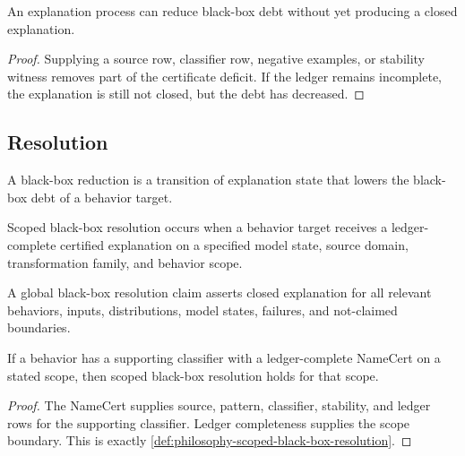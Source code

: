 \begin{theorem}
\label{thm:philosophy-black-box-debt-can-decrease-before-closure}
An explanation process can reduce black-box debt without yet producing a
closed explanation.
\end{theorem}
\begin{proof}
Supplying a source row, classifier row, negative examples, or stability
witness removes part of the certificate deficit. If the ledger remains
incomplete, the explanation is still not closed, but the debt has
decreased.
\end{proof}

\subsection{Resolution}
\label{subsec:philosophy-black-box-resolution}

\begin{definition}
\label{def:philosophy-black-box-reduction}
A black-box reduction is a transition of explanation state that lowers
the black-box debt of a behavior target.
\end{definition}

\begin{definition}
\label{def:philosophy-scoped-black-box-resolution}
Scoped black-box resolution occurs when a behavior target receives a
ledger-complete certified explanation on a specified model state, source
domain, transformation family, and behavior scope.
\end{definition}

\begin{definition}
\label{def:philosophy-global-black-box-resolution-claim}
A global black-box resolution claim asserts closed explanation for all
relevant behaviors, inputs, distributions, model states, failures, and
not-claimed boundaries.
\end{definition}

\begin{theorem}
\label{thm:philosophy-scoped-resolution-by-namecert}
If a behavior has a supporting classifier with a ledger-complete NameCert
on a stated scope, then scoped black-box resolution holds for that scope.
\end{theorem}
\begin{proof}
The NameCert supplies source, pattern, classifier, stability, and ledger
rows for the supporting classifier. Ledger completeness supplies the
scope boundary. This is exactly
\autoref{def:philosophy-scoped-black-box-resolution}.
\end{proof}

